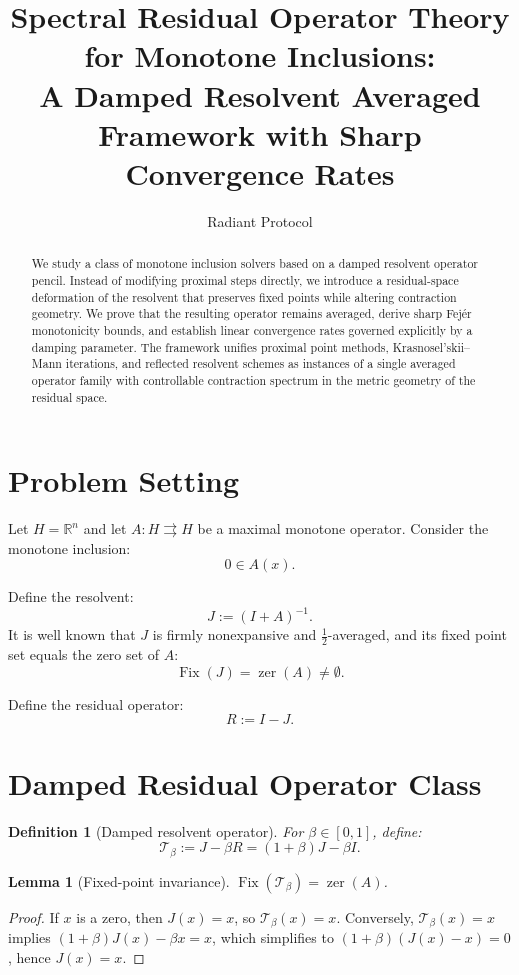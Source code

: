 \documentclass{article}
\title{Spectral Residual Operator Theory for Monotone Inclusions:\\
A Damped Resolvent Averaged Framework with Sharp Convergence Rates}
\author{Radiant Protocol}
\date{}
\newtheorem{lemma}{Lemma}
\newtheorem{definition}{Definition}
\begin{document}
\maketitle

\begin{abstract}
We study a class of monotone inclusion solvers based on a damped resolvent operator pencil. Instead of modifying proximal steps directly, we introduce a residual-space deformation of the resolvent that preserves fixed points while altering contraction geometry. We prove that the resulting operator remains averaged, derive sharp Fejér monotonicity bounds, and establish linear convergence rates governed explicitly by a damping parameter. The framework unifies proximal point methods, Krasnosel'skii–Mann iterations, and reflected resolvent schemes as instances of a single averaged operator family with controllable contraction spectrum in the metric geometry of the residual space.
\end{abstract}

\section{Problem Setting}

Let $H=\mathbb{R}^n$ and let $A:H\rightrightarrows H$ be a maximal monotone operator. Consider the monotone inclusion:
\[
0 \in A(x).
\]

Define the resolvent:
\[
J := (I + A)^{-1}.
\]
It is well known that $J$ is firmly nonexpansive and $\tfrac12$-averaged, and its fixed point set equals the zero set of $A$:
\[
\operatorname{Fix}(J) = \operatorname{zer}(A) \neq \emptyset.
\]

Define the residual operator:
\[
R := I - J.
\]

\section{Damped Residual Operator Class}

\begin{definition}[Damped resolvent operator]
For $\beta \in [0,1]$, define:
\[
\mathcal{T}_\beta := J - \beta R = (1+\beta)J - \beta I.
\]
\end{definition}

\begin{lemma}[Fixed-point invariance]
$\operatorname{Fix}(\mathcal{T}_\beta) = \operatorname{zer}(A)$.
\end{lemma}
\begin{proof}
If $x$ is a zero, then $J(x)=x$, so $\mathcal{T}_\beta(x)=x$. Conversely, $\mathcal{T}_\beta(x)=x$ implies $(1+\beta)J(x)-\beta x = x$, which simplifies to $(1+\beta)(J(x)-x)=0$, hence $J(x)=x$.
\end{proof}
\end{document}
